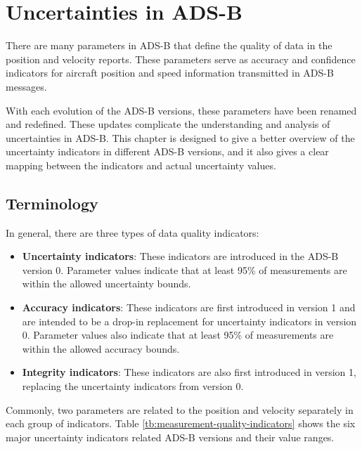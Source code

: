\chapter{Uncertainties in ADS-B} \label{chap:uncertainty}

There are many parameters in ADS-B that define the quality of data in the position and velocity reports. These parameters serve as accuracy and confidence indicators for aircraft position and speed information transmitted in ADS-B messages.

With each evolution of the ADS-B versions, these parameters have been renamed and redefined. These updates complicate the understanding and analysis of uncertainties in ADS-B. This chapter is designed to give a better overview of the uncertainty indicators in different ADS-B versions, and it also gives a clear mapping between the indicators and actual uncertainty values.

\section{Terminology}
In general, there are three types of data quality indicators:

\begin{itemize}
  \item \textbf{Uncertainty indicators}: These indicators are introduced in the ADS-B version 0. Parameter values indicate that at least 95\% of measurements are within the allowed uncertainty bounds.
  \item \textbf{Accuracy indicators}: These indicators are first introduced in version 1 and are intended to be a drop-in replacement for uncertainty indicators in version 0. Parameter values also indicate that at least 95\% of measurements are within the allowed accuracy bounds.
  \item \textbf{Integrity indicators}: These indicators are also first introduced in version 1, replacing the uncertainty indicators from version 0.
\end{itemize}

Commonly, two parameters are related to the position and velocity separately in each group of indicators. Table \ref{tb:measurement-quality-indicators} shows the six major uncertainty indicators related ADS-B versions and their value ranges.

